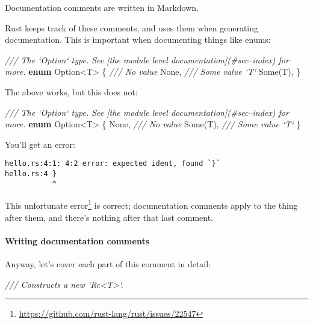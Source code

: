 \documentclass[a4paper,]{book}
\newenvironment{Shaded}{\begin{snugshade}}{\end{snugshade}}
\newcommand{\KeywordTok}[1]{\textcolor[rgb]{0.13,0.29,0.53}{\textbf{{#1}}}}
\newcommand{\DataTypeTok}[1]{\textcolor[rgb]{0.13,0.29,0.53}{{#1}}}
\newcommand{\ConstantTok}[1]{\textcolor[rgb]{0.00,0.00,0.00}{{#1}}}
\newcommand{\CommentTok}[1]{\textcolor[rgb]{0.56,0.35,0.01}{\textit{{#1}}}}
\newcommand{\NormalTok}[1]{{#1}}
\renewcommand{\href}[2]{#2\footnote{\url{#1}}}
\let\oldparagraph\paragraph
\renewcommand{\paragraph}[1]{\oldparagraph{#1}\mbox{}}
\begin{document}
Documentation comments are written in Markdown.

Rust keeps track of these comments, and uses them when generating
documentation. This is important when documenting things like enums:

\begin{Shaded}
\begin{Highlighting}[]
\CommentTok{/// The `Option` type. See [the module level documentation](#sec--index) for more.}
\KeywordTok{enum} \DataTypeTok{Option}\NormalTok{<T> \{}
    \CommentTok{/// No value}
    \ConstantTok{None}\NormalTok{,}
    \CommentTok{/// Some value `T`}
    \ConstantTok{Some}\NormalTok{(T),}
\NormalTok{\}}
\end{Highlighting}
\end{Shaded}

The above works, but this does not:

\begin{Shaded}
\begin{Highlighting}[]
\CommentTok{/// The `Option` type. See [the module level documentation](#sec--index) for more.}
\KeywordTok{enum} \DataTypeTok{Option}\NormalTok{<T> \{}
    \ConstantTok{None}\NormalTok{, }\CommentTok{/// No value}
    \ConstantTok{Some}\NormalTok{(T), }\CommentTok{/// Some value `T`}
\NormalTok{\}}
\end{Highlighting}
\end{Shaded}

You'll get an error:

\begin{verbatim}
hello.rs:4:1: 4:2 error: expected ident, found `}`
hello.rs:4 }
           ^
\end{verbatim}

This \href{https://github.com/rust-lang/rust/issues/22547}{unfortunate
error} is correct; documentation comments apply to the thing after them,
and there's nothing after that last comment.

\paragraph{Writing documentation
comments}\label{writing-documentation-comments}

Anyway, let's cover each part of this comment in detail:

\begin{Shaded}
\begin{Highlighting}[]
\CommentTok{/// Constructs a new `Rc<T>`.}
\end{Highlighting}
\end{Shaded}
\end{document}
